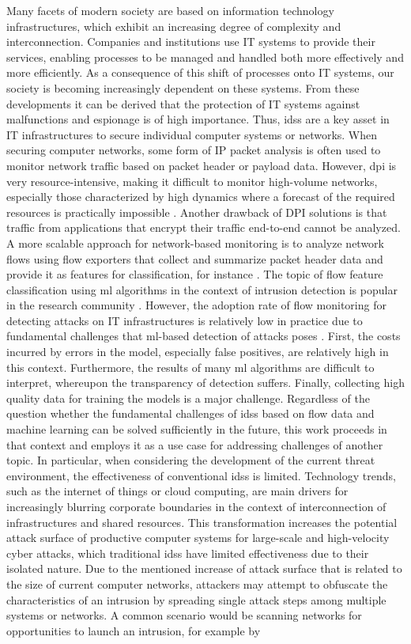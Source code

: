 \documentclass[../../main.tex]{subfiles}
\begin{document}
Many facets of modern society are based on information technology infrastructures, which exhibit an increasing degree of complexity and interconnection. Companies and institutions use IT systems to provide their services, enabling processes to be managed and handled both more effectively and more efficiently. As a consequence of this shift of processes onto IT systems, our society is becoming increasingly dependent on these systems. From these developments it can be derived that the protection of IT systems against malfunctions and espionage is of high importance. Thus, \glspl{ids} are a key asset in IT infrastructures to secure individual computer systems or networks. When securing computer networks, some form of IP packet analysis is often used to monitor network traffic based on packet header or payload data.
However, \gls{dpi} is very resource-intensive, making it difficult to monitor high-volume networks, especially those characterized by high dynamics where a forecast of the required resources is practically impossible \cite{dreger2004operational}. Another drawback of DPI solutions is that traffic from applications that encrypt their traffic end-to-end cannot be analyzed. A more scalable approach for network-based monitoring is to analyze network flows using flow exporters that collect and summarize packet header data and provide it as features for classification, for instance \cite{hofstede2018flow} . The topic of flow feature classification using \gls{ml} algorithms in the context of intrusion detection is popular in the research community  \cite{ahmad2021network}. However, the adoption rate of flow monitoring for detecting attacks on IT infrastructures is relatively low in practice due to fundamental challenges that \gls{ml}-based detection of attacks poses \cite{som_2010}. First, the costs incurred by errors in the model, especially false positives, are relatively high in this context. Furthermore, the results of many \gls{ml} algorithms are difficult to interpret, whereupon the transparency of detection suffers. Finally, collecting high quality data for training the models is a major challenge. Regardless of the question whether the fundamental challenges of \glspl{ids} based on flow data and machine learning can be solved sufficiently in the future, this work proceeds in that context and employs it as a use case for addressing challenges of another topic. In particular, when considering the development of the current threat environment, the effectiveness of conventional \glspl{ids} is limited. Technology trends, such as the internet of things or cloud computing, are main drivers for increasingly blurring corporate boundaries in the context of interconnection of infrastructures and shared resources. This transformation increases the potential attack surface of productive computer systems for large-scale and high-velocity cyber attacks, which traditional \glspl{ids} have limited effectiveness due to their isolated nature. Due to the mentioned increase of attack surface that is related to the size of current computer networks, attackers may attempt to obfuscate the characteristics of an intrusion by spreading single attack steps among multiple systems or networks. A common scenario would be scanning networks for opportunities to launch an intrusion, for example by 
\end{document}
